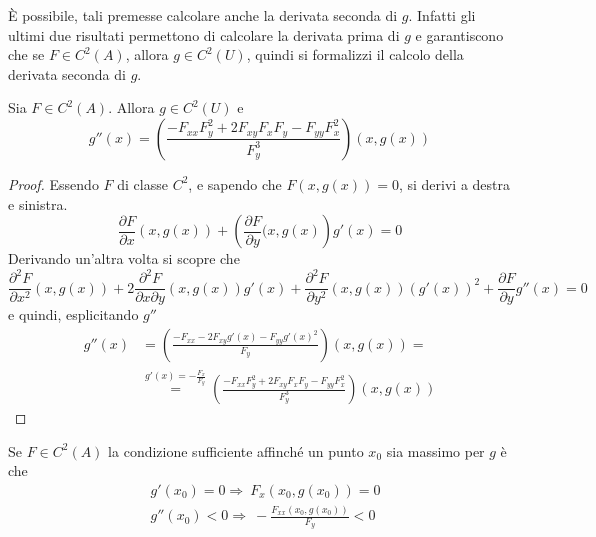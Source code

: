 È possibile, tali premesse calcolare anche la derivata seconda di $g$. Infatti gli ultimi due risultati permettono di calcolare la derivata prima di $g$ e garantiscono che se $F \in C^2(A)$, allora $g \in C^2(U)$, quindi si formalizzi il calcolo della derivata seconda di $g$.
\begin{theorem}
Sia $F \in C^2(A)$. Allora $g \in C^2(U)$ e
\begin{equation}
    g''(x)= \left(\frac{-F_{xx}F_{y}^2+2F_{xy}F_xF_y-F_{yy}F_x^2}{F_y^3}\right)(x, g(x))
\end{equation}
\end{theorem}
\begin{proof}
Essendo $F$ di classe $C^2$, e sapendo che $F(x,g(x))=0$, si derivi a destra e sinistra.
\begin{equation}
    \frac{\partial{F}}{\partial{x}}(x, g(x))+\left(\frac{\partial{F}}{\partial{y}}(x, g(x)\right)g'(x)=0
\end{equation}
Derivando un'altra volta si scopre che
\begin{equation}
    \frac{\partial^2{F}}{\partial{x^2}}(x, g(x))+ 2 \frac{\partial^2{F}}{\partial{x}\partial{y}}(x, g(x))g'(x) + \frac{\partial^2{F}}{\partial{y^2}}(x, g(x))(g'(x))^2+ \frac{\partial{F}}{\partial{y}}g''(x) =0
\end{equation}
e quindi, esplicitando $g''$
\begin{equation}
\begin{aligned}
    g''(x)&= \left(\frac{-F_{xx}-2F_{xy}g'(x)- F_{yy}g'(x)^2}{F_y}\right)(x, g(x))=\\
    &\overset{g'(x)=-\tfrac{F_x}{F_y}}{=} \left(\frac{-F_{xx}F_{y}^2+2F_{xy}F_xF_y-F_{yy}F_x^2}{F_y^3}\right)(x, g(x))
\end{aligned}
\end{equation}
\end{proof}
\begin{oss}
    Se $F \in C^2(A)$ la condizione sufficiente affinché un punto $x_0$ sia massimo per $g$ è che
    \begin{equation}
        \begin{aligned}
            &g'(x_0)=0 \Rightarrow\ F_x(x_0, g(x_0))=0\\
            &g''(x_0)<0 \Rightarrow\ -\frac{F_{xx}(x_0, g(x_0))}{F_y} < 0
        \end{aligned}
    \end{equation}
\end{oss}
